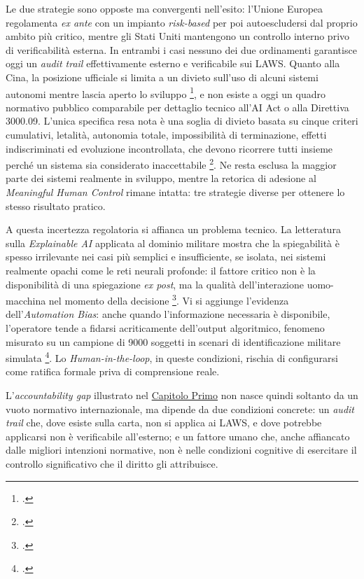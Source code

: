 \documentclass[a4paper,12pt]{report}
\begin{document}
Le due strategie sono opposte ma convergenti nell'esito: l'Unione Europea
regolamenta \textit{ex ante} con un impianto \textit{risk-based} per poi
autoescludersi dal proprio ambito più critico, mentre gli Stati Uniti mantengono
un controllo interno privo di verificabilità esterna. In entrambi i casi nessuno
dei due ordinamenti garantisce oggi un \textit{audit trail} effettivamente
esterno e verificabile sui LAWS. Quanto alla Cina, la posizione ufficiale si
limita a un divieto sull'uso di alcuni sistemi autonomi mentre lascia aperto lo
sviluppo \footcite[p.~4]{wareham_2020}, e non esiste a oggi un quadro normativo
pubblico comparabile per dettaglio tecnico all'AI Act o alla Direttiva 3000.09.
L'unica specifica resa nota è una soglia di divieto basata su cinque criteri
cumulativi, letalità, autonomia totale, impossibilità di terminazione, effetti
indiscriminati ed evoluzione incontrollata, che devono ricorrere tutti insieme
perché un sistema sia considerato inaccettabile \footcite{mako_2026_china_mhc}.
Ne resta esclusa la maggior parte dei sistemi realmente in sviluppo, mentre la
retorica di adesione al \textit{Meaningful Human Control} rimane intatta: tre
strategie diverse per ottenere lo stesso risultato pratico.

A questa incertezza regolatoria si affianca un problema tecnico. La letteratura
sulla \textit{Explainable AI} applicata al dominio militare mostra che la
spiegabilità è spesso irrilevante nei casi più semplici e insufficiente, se
isolata, nei sistemi realmente opachi come le reti neurali profonde: il fattore
critico non è la disponibilità di una spiegazione \textit{ex post}, ma la qualità
dell'interazione uomo-macchina nel momento della decisione
\footcite{wood_2024_xai}. Vi si aggiunge l'evidenza dell'\textit{Automation
Bias}: anche quando l'informazione necessaria è disponibile, l'operatore tende a
fidarsi acriticamente dell'output algoritmico, fenomeno misurato su un campione
di 9000 soggetti in scenari di identificazione militare simulata
\footcite{horowitz_kahn_2024}. Lo \textit{Human-in-the-loop}, in queste
condizioni, rischia di configurarsi come ratifica formale priva di comprensione
reale.

L'\textit{accountability gap} illustrato nel \hyperref[cap1]{Capitolo Primo} non nasce quindi
soltanto da un vuoto normativo internazionale, ma dipende da due condizioni
concrete: un \textit{audit trail} che, dove esiste sulla carta, non si applica ai
LAWS, e dove potrebbe applicarsi non è verificabile all'esterno; e un fattore
umano che, anche affiancato dalle migliori intenzioni normative, non è nelle
condizioni cognitive di esercitare il controllo significativo che il diritto gli
attribuisce.
\end{document}
